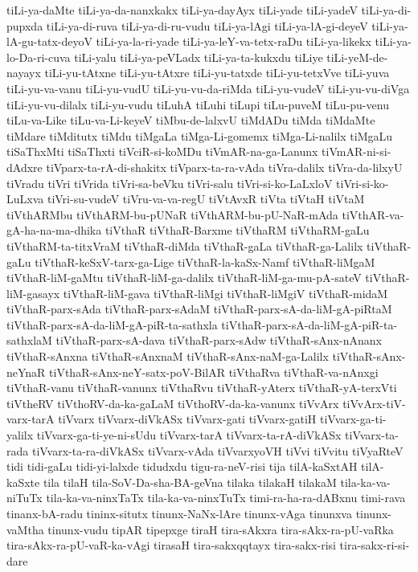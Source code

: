 {tiLi-ya-daMte
tiLi-ya-da-nanxkakx
tiLi-ya-dayAyx
tiLi-yade
tiLi-yadeV
tiLi-ya-di-pupxda
tiLi-ya-di-ruva
tiLi-ya-di-ru-vudu
tiLi-ya-lAgi
tiLi-ya-lA-gi-deyeV
tiLi-ya-lA-gu-tatx-deyoV
tiLi-ya-la-ri-yade
tiLi-ya-leY-va-tetx-raDu
tiLi-ya-likekx
tiLi-ya-lo-Da-ri-cuva
tiLi-yalu
tiLi-ya-peVLadx
tiLi-ya-ta-kukxdu
tiLiye
tiLi-yeM-de-nayayx
tiLi-yu-tAtxne
tiLi-yu-tAtxre
tiLi-yu-tatxde
tiLi-yu-tetxVve
tiLi-yuva
tiLi-yu-va-vanu
tiLi-yu-vudU
tiLi-yu-vu-da-riMda
tiLi-yu-vudeV
tiLi-yu-vu-diVga
tiLi-yu-vu-dilalx
tiLi-yu-vudu
tiLuhA
tiLuhi
tiLupi
tiLu-puveM
tiLu-pu-venu
tiLu-va-Like
tiLu-va-Li-keyeV
tiMbu-de-lalxvU
tiMdADu
tiMda
tiMdaMte
tiMdare
tiMditutx
tiMdu
tiMgaLa
tiMga-Li-gomemx
tiMga-Li-nalilx
tiMgaLu
tiSaThxMti
tiSaThxti
tiVciR-si-koMDu
tiVmAR-na-ga-Lanunx
tiVmAR-ni-si-dAdxre
tiVparx-ta-rA-di-shakitx
tiVparx-ta-ra-vAda
tiVra-dalilx
tiVra-da-lilxyU
tiVradu
tiVri
tiVrida
tiVri-sa-beVku
tiVri-salu
tiVri-si-ko-LaLxloV
tiVri-si-ko-LuLxva
tiVri-su-vudeV
tiVru-va-va-regU
tiVtAvxR
tiVta
tiVtaH
tiVtaM
tiVthARMbu
tiVthARM-bu-pUNaR
tiVthARM-bu-pU-NaR-mAda
tiVthAR-va-gA-ha-na-ma-dhika
tiVthaR
tiVthaR-Barxme
tiVthaRM
tiVthaRM-gaLu
tiVthaRM-ta-titxVraM
tiVthaR-diMda
tiVthaR-gaLa
tiVthaR-ga-Lalilx
tiVthaR-gaLu
tiVthaR-keSxV-tarx-ga-Lige
tiVthaR-la-kaSx-Namf
tiVthaR-liMgaM
tiVthaR-liM-gaMtu
tiVthaR-liM-ga-dalilx
tiVthaR-liM-ga-mu-pA-sateV
tiVthaR-liM-gasayx
tiVthaR-liM-gava
tiVthaR-liMgi
tiVthaR-liMgiV
tiVthaR-midaM
tiVthaR-parx-sAda
tiVthaR-parx-sAdaM
tiVthaR-parx-sA-da-liM-gA-piRtaM
tiVthaR-parx-sA-da-liM-gA-piR-ta-sathxla
tiVthaR-parx-sA-da-liM-gA-piR-ta-sathxlaM
tiVthaR-parx-sA-dava
tiVthaR-parx-sAdw
tiVthaR-sAnx-nAnanx
tiVthaR-sAnxna
tiVthaR-sAnxnaM
tiVthaR-sAnx-naM-ga-Lalilx
tiVthaR-sAnx-neYnaR
tiVthaR-sAnx-neY-satx-poV-BilAR
tiVthaRva
tiVthaR-va-nAnxgi
tiVthaR-vanu
tiVthaR-vanunx
tiVthaRvu
tiVthaR-yAterx
tiVthaR-yA-terxVti
tiVtheRV
tiVthoRV-da-ka-gaLaM
tiVthoRV-da-ka-vanunx
tiVvArx
tiVvArx-tiV-varx-tarA
tiVvarx
tiVvarx-diVkASx
tiVvarx-gati
tiVvarx-gatiH
tiVvarx-ga-ti-yalilx
tiVvarx-ga-ti-ye-ni-sUdu
tiVvarx-tarA
tiVvarx-ta-rA-diVkASx
tiVvarx-ta-rada
tiVvarx-ta-ra-diVkASx
tiVvarx-vAda
tiVvarxyoVH
tiVvi
tiVvitu
tiVyaRteV
tidi
tidi-gaLu
tidi-yi-lalxde
tidudxdu
tigu-ra-neV-risi
tija
tilA-kaSxtAH
tilA-kaSxte
tila
tilaH
tila-SoV-Da-sha-BA-geVna
tilaka
tilakaH
tilakaM
tila-ka-va-niTuTx
tila-ka-va-ninxTaTx
tila-ka-va-ninxTuTx
timi-ra-ha-ra-dABxnu
timi-rava
tinanx-bA-radu
tininx-situtx
tinunx-NaNx-lAre
tinunx-vAga
tinunxva
tinunx-vaMtha
tinunx-vudu
tipAR
tipepxge
tiraH
tira-sAkxra
tira-sAkx-ra-pU-vaRka
tira-sAkx-ra-pU-vaR-ka-vAgi
tirasaH
tira-sakxqqtayx
tira-sakx-risi
tira-sakx-ri-si-dare
}
